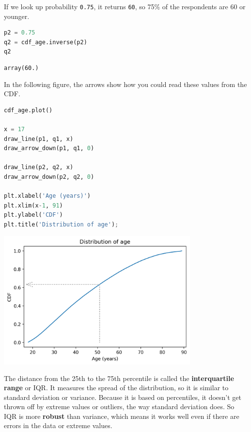 If we look up probability \passthrough{\lstinline!0.75!}, it returns
\passthrough{\lstinline!60!}, so 75\% of the respondents are 60 or
younger.

\begin{lstlisting}[language=Python,style=source]
p2 = 0.75
q2 = cdf_age.inverse(p2)
q2
\end{lstlisting}

\begin{lstlisting}[style=output]
array(60.)
\end{lstlisting}

In the following figure, the arrows show how you could read these values
from the CDF.

\begin{lstlisting}[language=Python,style=source]
cdf_age.plot()

x = 17
draw_line(p1, q1, x)
draw_arrow_down(p1, q1, 0)

draw_line(p2, q2, x)
draw_arrow_down(p2, q2, 0)

plt.xlabel('Age (years)')
plt.xlim(x-1, 91)
plt.ylabel('CDF')
plt.title('Distribution of age');
\end{lstlisting}

\begin{center}
\includegraphics[width=4in]{chapters/08_distributions_files/08_distributions_71_0.png}
\end{center}

The distance from the 25th to the 75th percentile is called the
\textbf{interquartile range} or IQR. It measures the spread of the
distribution, so it is similar to standard deviation or variance.
Because it is based on percentiles, it doesn't get thrown off by extreme
values or outliers, the way standard deviation does. So IQR is more
\textbf{robust} than variance, which means it works well even if there
are errors in the data or extreme values.

